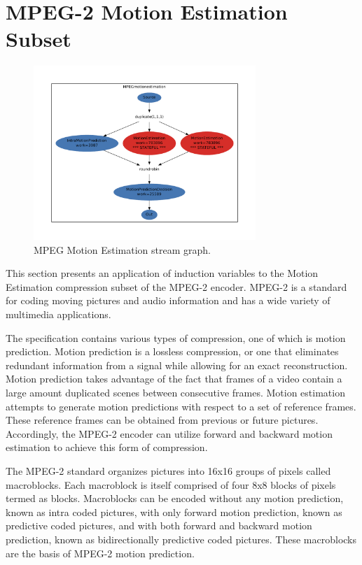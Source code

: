 \section{MPEG-2 Motion Estimation Subset}
\label{sec:mpeg}

\begin{figure}[t]
\includegraphics[width=3.3in]{figures/work_estimate_mpeg_motionestimation.pdf}
\caption{MPEG Motion Estimation stream graph.\protect\label{fig:mpegMEgraph}}
\end{figure}


This section presents an application of induction variables to the Motion Estimation compression subset of the MPEG-2 encoder.  MPEG-2 is a standard for coding moving pictures and audio information and has a wide variety of multimedia applications.  

The specification contains various types of compression, one of which is motion prediction.  Motion prediction is a lossless compression, or one that eliminates redundant information from a signal while allowing for an exact reconstruction.  Motion prediction takes advantage of the fact that frames of a video contain a large amount duplicated scenes between consecutive frames.  Motion estimation attempts to generate motion predictions with respect to a set of reference frames.  These reference frames can be obtained from previous or future pictures.  Accordingly, the MPEG-2 encoder can utilize forward and backward motion estimation to achieve this form of compression.

The MPEG-2 standard organizes pictures into 16x16 groups of pixels called macroblocks.  Each macroblock is itself comprised of four 8x8 blocks of pixels termed as blocks.  Macroblocks can be encoded without any motion prediction, known as intra coded pictures, with only forward motion prediction, known as predictive coded pictures, and with both forward and backward motion prediction, known as bidirectionally predictive coded pictures.  These macroblocks are the basis of MPEG-2 motion prediction.  

